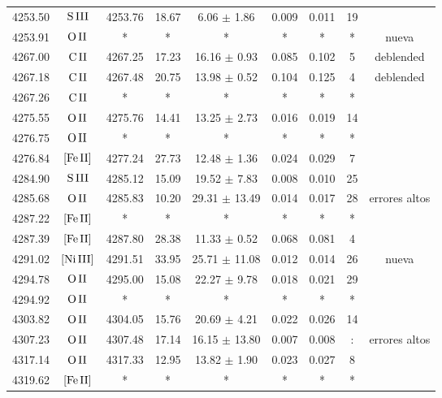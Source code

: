\documentclass{article}
\begin{document}
\begin{table*}
\begin{adjustbox}{width=\textwidth}
\begin{tabular}{ccccccccc}
4253.50 & $\mbox{S}\thinspace \mbox{III}$ & 4253.76 & 18.67 & 6.06 $\pm$ 1.86 & 0.009 & 0.011 & 19 &  \\
4253.91 & $\mbox{O}\thinspace \mbox{II}$ & * & * & * & * & * & * &  nueva \\
4267.00 & $\mbox{C}\thinspace \mbox{II}$ & 4267.25 & 17.23 & 16.16 $\pm$ 0.93 & 0.085 & 0.102 & 5 &  deblended \\
4267.18 & $\mbox{C}\thinspace \mbox{II}$ & 4267.48 & 20.75 & 13.98 $\pm$ 0.52 & 0.104 & 0.125 & 4 &  deblended \\
4267.26 & $\mbox{C}\thinspace \mbox{II}$ & * & * & * & * & * & * &  \\
4275.55 & $\mbox{O}\thinspace \mbox{II}$ & 4275.76 & 14.41 & 13.25 $\pm$ 2.73 & 0.016 & 0.019 & 14 &  \\
4276.75 & $\mbox{O}\thinspace \mbox{II}$ & * & * & * & * & * & * &  \\
4276.84 & $\mbox{[Fe}\thinspace \mbox{II]}$ & 4277.24 & 27.73 & 12.48 $\pm$ 1.36 & 0.024 & 0.029 & 7 &  \\
4284.90 & $\mbox{S}\thinspace \mbox{III}$ & 4285.12 & 15.09 & 19.52 $\pm$ 7.83 & 0.008 & 0.010 & 25 &  \\
4285.68 & $\mbox{O}\thinspace \mbox{II}$ & 4285.83 & 10.20 & 29.31 $\pm$ 13.49 & 0.014 & 0.017 & 28 &  errores altos \\
4287.22 & $\mbox{[Fe}\thinspace \mbox{II]}$ & * & * & * & * & * & * &  \\
4287.39 & $\mbox{[Fe}\thinspace \mbox{II]}$ & 4287.80 & 28.38 & 11.33 $\pm$ 0.52 & 0.068 & 0.081 & 4 &  \\
4291.02 & $\mbox{[Ni}\thinspace \mbox{III]}$ & 4291.51 & 33.95 & 25.71 $\pm$ 11.08 & 0.012 & 0.014 & 26 &  nueva \\
4294.78 & $\mbox{O}\thinspace \mbox{II}$ & 4295.00 & 15.08 & 22.27 $\pm$ 9.78 & 0.018 & 0.021 & 29 &  \\
4294.92 & $\mbox{O}\thinspace \mbox{II}$ & * & * & * & * & * & * &  \\
4303.82 & $\mbox{O}\thinspace \mbox{II}$ & 4304.05 & 15.76 & 20.69 $\pm$ 4.21 & 0.022 & 0.026 & 14 &  \\
4307.23 & $\mbox{O}\thinspace \mbox{II}$ & 4307.48 & 17.14 & 16.15 $\pm$ 13.80 & 0.007 & 0.008 & : &  errores altos \\
4317.14 & $\mbox{O}\thinspace \mbox{II}$ & 4317.33 & 12.95 & 13.82 $\pm$ 1.90 & 0.023 & 0.027 & 8 &  \\
4319.62 & $\mbox{[Fe}\thinspace \mbox{II]}$ & * & * & * & * & * & * &  \\

\end{tabular}
\end{adjustbox}
\end{table*}
\end{document}
